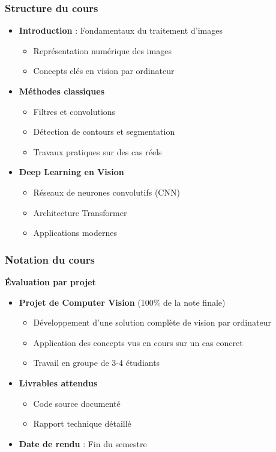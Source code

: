 \documentclass{beamer}
\begin{document}
 \begin{frame}
    \frametitle{Structure du cours}
    \begin{itemize}
        \item \textbf{Introduction} : Fondamentaux du traitement d'images
        \begin{itemize}
            \item Représentation numérique des images
            \item Concepts clés en vision par ordinateur
        \end{itemize}
        \item \textbf{Méthodes classiques}
        \begin{itemize}
            \item Filtres et convolutions
            \item Détection de contours et segmentation
            \item Travaux pratiques sur des cas réels
        \end{itemize}
        \item \textbf{Deep Learning en Vision}
        \begin{itemize}
            \item Réseaux de neurones convolutifs (CNN)
            \item Architecture Transformer
            \item Applications modernes
        \end{itemize}
    \end{itemize}
\end{frame}

\begin{frame}
    \frametitle{Notation du cours}
    \textbf{Évaluation par projet}
    \begin{itemize}
        \item \textbf{Projet de Computer Vision} (100\% de la note finale)
        \begin{itemize}
            \item Développement d'une solution complète de vision par ordinateur
            \item Application des concepts vus en cours sur un cas concret
            \item Travail en groupe de 3-4 étudiants
        \end{itemize}
        \item \textbf{Livrables attendus}
        \begin{itemize}
            \item Code source documenté
            \item Rapport technique détaillé
        \end{itemize}
        \item \textbf{Date de rendu} : Fin du semestre
    \end{itemize}
\end{frame}
\end{document}

